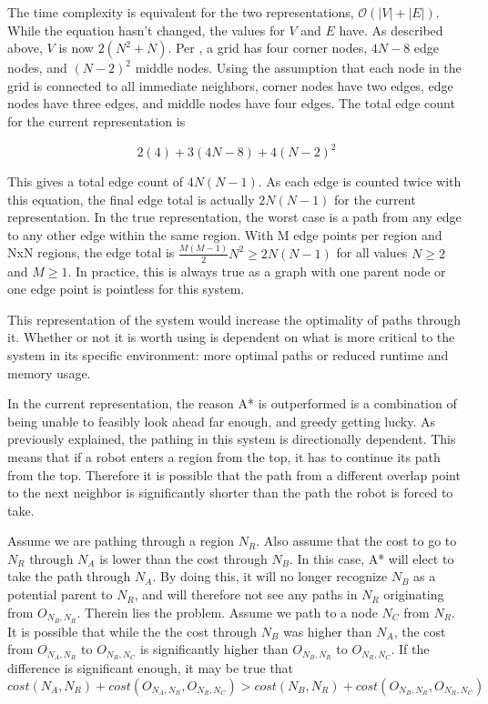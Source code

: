 The time complexity is equivalent for the two representations, $\mathcal{O}(|V| + |E|)$. While the equation hasn't changed, the values for $V$ and $E$ have. As described above, $V$ is now $2(N^2 + N)$. Per \cite{HPA}, a grid has four corner nodes, $4N-8$ edge nodes, and $(N-2)^2$ middle nodes. Using the assumption that each node in the grid is connected to all immediate neighbors, corner nodes have two edges, edge nodes have three edges, and middle nodes have four edges. The total edge count for the current representation is 

$$2(4) + 3(4N-8) + 4(N-2)^2$$

This gives a total edge count of $4N(N-1)$. As each edge is counted twice with this equation, the final edge total is actually $2N(N-1)$ for the current representation. In the true representation, the worst case is a path from any edge to any other edge within the same region. With M edge points per region and NxN regions, the edge total is $\frac{M(M-1)}{2}N^2 \geq 2N(N-1)$ for all values $N \geq 2$ and $M \geq 1$. In practice, this is always true as a graph with one parent node or one edge point is pointless for this system.

This representation of the system would increase the optimality of paths through it.  Whether or not it is worth using is dependent on what is more critical to the system in its specific environment: more optimal paths or reduced runtime and memory usage.

In the current representation, the reason A* is outperformed is a combination of being unable to feasibly look ahead far enough, and greedy getting lucky. As previously explained, the pathing in this system is directionally dependent. This means that if a robot enters a region from the top, it has to continue its path from the top. Therefore it is possible that the path from a different overlap point to the next neighbor is significantly shorter than the path the robot is forced to take. 

Assume we are pathing through a region $N_R$. Also assume that the cost to go to $N_R$ through $N_A$ is lower than the cost through $N_B$. In this case, A* will elect to take the path through $N_A$. By doing this, it will no longer recognize $N_B$ as a potential parent to $N_R$, and will therefore not see any paths in $N_R$ originating from $O_{N_B, N_R}$. Therein lies the problem. Assume we path to a node $N_C$ from $N_R$. It is possible that while the the cost through $N_B$ was higher than $N_A$, the cost from $O_{N_A, N_R}$ to $O_{N_R, N_C}$ is significantly higher than $O_{N_B, N_R}$ to $O_{N_R, N_C}$. If the difference is significant enough, it may be true that $$cost(N_A, N_R) + cost(O_{N_A, N_R}, O_{N_R, N_C}) > cost(N_B, N_R) + cost(O_{N_B, N_R}, O_{N_R, N_C})$$

